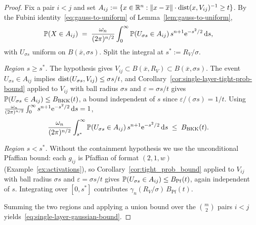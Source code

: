 \begin{proof}
  Fix a pair $i < j$ and set $A_{ij} := \{x \in \mathbb{R}^n : \|x - \overline x\|\cdot\operatorname{dist}(x, V_{ij})^{-1} \geq t\}$. By the Fubini identity~\eqref{eq:gauss-to-uniform} of Lemma~\ref{lem:gauss-to-uniform},
  \begin{equation*}
    \mathbb{P}(X \in A_{ij}) \;=\; \frac{\omega_n}{(2\pi)^{n/2}} \int_0^\infty \mathbb{P}(U_{\sigma s} \in A_{ij})\,s^{n+1}\mathrm{e}^{-s^2/2}\,\mathrm{d}{s},
  \end{equation*}
  with $U_{\sigma s}$ uniform on $B(\overline x, \sigma s)$. Split the integral at $s^* := R_V/\sigma$.

  \emph{Region $s \geq s^*$.} The hypothesis gives $V_{ij} \subset B(\overline x, R_V) \subset B(\overline x, \sigma s)$. The event $U_{\sigma s} \in A_{ij}$ implies $\operatorname{dist}(U_{\sigma s}, V_{ij}) \leq \sigma s/t$, and Corollary~\ref{cor:single-layer-tight-prob-bound} applied to $V_{ij}$ with ball radius $\sigma s$ and $\varepsilon = \sigma s/t$ gives $\mathbb{P}(U_{\sigma s} \in A_{ij}) \leq B_{\mathrm{BKK}}(t)$, a bound independent of $s$ since $\varepsilon/(\sigma s) = 1/t$. Using $\frac{\omega_n}{(2\pi)^{n/2}}\int_0^\infty s^{n+1}\mathrm{e}^{-s^2/2}\,\mathrm{d}{s} = 1$,
  \begin{equation*}
    \frac{\omega_n}{(2\pi)^{n/2}}\int_{s^*}^\infty \mathbb{P}(U_{\sigma s} \in A_{ij})\,s^{n+1}\mathrm{e}^{-s^2/2}\,\mathrm{d}{s} \;\leq\; B_{\mathrm{BKK}}(t).
  \end{equation*}

  \emph{Region $s < s^*$.} Without the containment hypothesis we use the unconditional Pfaffian bound: each $g_{ij}$ is Pfaffian of format $(2,1,w)$ (Example~\ref{ex:activations}), so Corollary~\ref{cor:tight_prob_bound} applied to $V_{ij}$ with ball radius $\sigma s$ and $\varepsilon = \sigma s/t$ gives $\mathbb{P}(U_{\sigma s} \in A_{ij}) \leq B_{\mathrm{Pf}}(t)$, again independent of $s$. Integrating over $[0, s^*]$ contributes $\gamma_n(R_V/\sigma)\,B_{\mathrm{Pf}}(t)$.

  Summing the two regions and applying a union bound over the $\binom{m}{2}$ pairs $i < j$ yields~\eqref{eq:single-layer-gaussian-bound}.
\end{proof}

